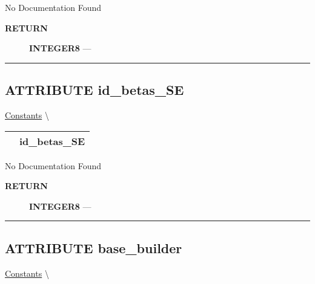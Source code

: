 No Documentation Found








\par
\begin{description}
\item [\colorbox{tagtype}{\color{white} \textbf{\textsf{RETURN}}}] \textbf{INTEGER8} --- 
\end{description}




\rule{\linewidth}{0.5pt}
\subsection*{\textsf{\colorbox{headtoc}{\color{white} ATTRIBUTE}
id\_betas\_SE}}

\hypertarget{ecldoc:constants.id_betas_se}{}
\hspace{0pt} \hyperlink{ecldoc:Constants}{Constants} \textbackslash 

{\renewcommand{\arraystretch}{1.5}
\begin{tabularx}{\textwidth}{|>{\raggedright\arraybackslash}l|X|}
\hline
\hspace{0pt}\mytexttt{\color{red} } & \textbf{id\_betas\_SE} \\
\hline
\end{tabularx}
}

\par





No Documentation Found








\par
\begin{description}
\item [\colorbox{tagtype}{\color{white} \textbf{\textsf{RETURN}}}] \textbf{INTEGER8} --- 
\end{description}




\rule{\linewidth}{0.5pt}
\subsection*{\textsf{\colorbox{headtoc}{\color{white} ATTRIBUTE}
base\_builder}}

\hypertarget{ecldoc:constants.base_builder}{}
\hspace{0pt} \hyperlink{ecldoc:Constants}{Constants} \textbackslash 

